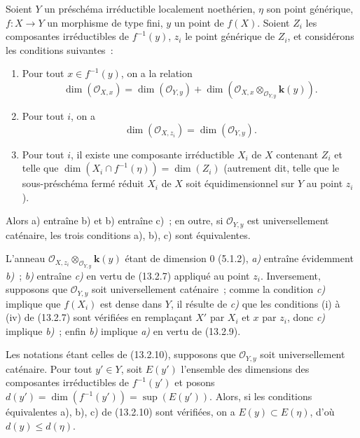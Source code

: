 \begin{proposition}[13.2.10]
\label{IV.13.2.10-fr}
Soient $Y$ un préschéma irréductible localement noethérien, $\eta$ son point
générique, $f:X\to Y$ un morphisme de type fini, $y$ un point de $f(X)$.
Soient $Z_i$ les
composantes irréductibles de $f^{-1}(y)$, $z_i$ le point générique de $Z_i$,
et considérons les conditions suivantes~:
\begin{enumerate}[label=\emph{\alph*)}]
  \item Pour tout $x\in f^{-1}(y)$, on a la relation
  \[
  \tag{13.2.10.1}
  \label{IV.13.2.10.1-fr}
    \dim(\mathcal O_{X,x})=\dim(\mathcal O_{Y,y})
    +\dim(\mathcal O_{X,x}\otimes_{\mathcal O_{Y,y}}\boldsymbol{k}(y)).
  \]
  \item Pour tout $i$, on a
  \[
  \tag{13.2.10.2}
  \label{IV.13.2.10.2-fr}
    \dim(\mathcal O_{X,z_i})=\dim(\mathcal O_{Y,y}).
  \]
  \item Pour tout $i$, il existe une composante irréductible $X_i$ de $X$
  contenant $Z_i$ et telle que
  $\dim(X_i\cap f^{-1}(\eta))=\dim(Z_i)$ \textup{(autrement dit, telle que} le
  sous-préschéma fermé réduit $X_i$ de $X$ soit équidimensionnel sur $Y$
  au point $z_i$).
\end{enumerate}

Alors \textup{a)} entraîne \textup{b)} et \textup{b)} entraîne \textup{c)}~; en outre, si
$\mathcal O_{Y,y}$ est universellement caténaire, les trois conditions \textup{a),
b), c)} sont équivalentes.
\end{proposition}

L'anneau $\mathcal O_{X,z_i}\otimes_{\mathcal O_{Y,y}}\boldsymbol{k}(y)$ étant de dimension
$0$ (5.1.2), \emph{a)} entraîne évidemment \emph{b)}~; \emph{b)} entraîne \emph{c)} en vertu de
(13.2.7) appliqué au point $z_i$. Inversement, supposons que
$\mathcal O_{Y,y}$ soit universellement caténaire~; comme la condition \emph{c)}
implique que $f(X_i)$ est dense dans $Y$, il résulte de \emph{c)} que les conditions
(i) à (iv) de (13.2.7) sont vérifiées en remplaçant $X'$ par $X_i$ et $x$ par
$z_i$, donc \emph{c)} implique \emph{b)}~; enfin \emph{b)} implique \emph{a)} en vertu de
(13.2.9).

\begin{corollary}[13.2.11]
\label{IV.13.2.11-fr}
Les notations étant celles de \textup{(13.2.10)}, supposons que $\mathcal O_{Y,y}$ soit
universellement caténaire. Pour tout $y'\in Y$, soit $E(y')$ l'ensemble des
dimensions des composantes irréductibles de $f^{-1}(y')$ et posons
$d(y')=\dim(f^{-1}(y'))=\sup(E(y'))$. Alors, si les conditions équivalentes
\textup{a), b), c)} de \textup{(13.2.10)} sont vérifiées, on a
$E(y)\subset E(\eta)$, d'où $d(y)\leq d(\eta)$.
\end{corollary}

